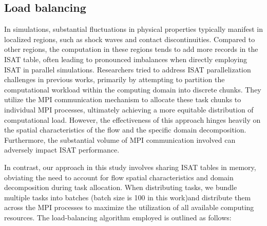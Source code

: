 


\subsection{Load balancing}

In simulations, substantial fluctuations in physical properties typically manifest in localized regions, such as shock waves and contact discontinuities. Compared to other regions, the computation in these regions tends to add more records in the ISAT table, often leading to pronounced imbalances when directly employing ISAT in parallel simulations. Researchers tried to address ISAT parallelization challenges in previous works\cite{lu2009computationally,wu2018parallel}, primarily by attempting to partition the computational workload within the computing domain into discrete chunks. They utilize the MPI communication mechanism to allocate these task chunks to individual MPI processes, ultimately achieving a more equitable distribution of computational load. However, the effectiveness of this approach hinges heavily on the spatial characteristics of the flow and the specific domain decomposition. Furthermore, the substantial volume of MPI communication involved can adversely impact ISAT performance.

In contrast, our approach in this study involves sharing ISAT tables in memory, obviating the need to account for flow spatial characteristics and domain decomposition during task allocation. When distributing tasks, we bundle multiple tasks into batches (batch size is 100 in this work)and distribute them across the MPI processes to maximize the utilization of all available computing resources. The load-balancing algorithm employed is outlined as follows:



